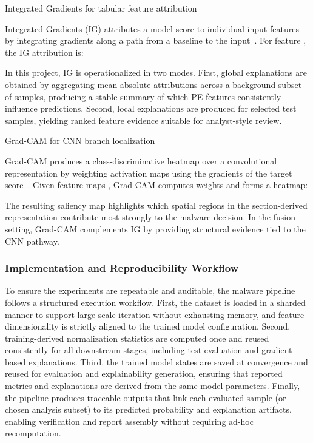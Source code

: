 \documentclass[conference]{IEEEtran}
\begin{document}
Integrated Gradients for tabular feature attribution

Integrated Gradients (IG) attributes a model score to individual input features by integrating gradients along a path from a baseline to the input~\cite{MAQ2017}. For feature , the IG attribution is:

In this project, IG is operationalized in two modes. First, global explanations are obtained by aggregating mean absolute attributions across a background subset of samples, producing a stable summary of which PE features consistently influence predictions. Second, local explanations are produced for selected test samples, yielding ranked feature evidence suitable for analyst-style review.

Grad-CAM for CNN branch localization

Grad-CAM produces a class-discriminative heatmap over a convolutional representation by weighting activation maps using the gradients of the target score~\cite{SCDVPB2017}. Given feature maps , Grad-CAM computes weights and forms a heatmap:

The resulting saliency map highlights which spatial regions in the section-derived representation contribute most strongly to the malware decision. In the fusion setting, Grad-CAM complements IG by providing structural evidence tied to the CNN pathway.

\subsubsection{Implementation and Reproducibility Workflow}

To ensure the experiments are repeatable and auditable, the malware pipeline follows a structured execution workflow. First, the dataset is loaded in a sharded manner to support large-scale iteration without exhausting memory, and feature dimensionality is strictly aligned to the trained model configuration. Second, training-derived normalization statistics are computed once and reused consistently for all downstream stages, including test evaluation and gradient-based explanations. Third, the trained model states are saved at convergence and reused for evaluation and explainability generation, ensuring that reported metrics and explanations are derived from the same model parameters. Finally, the pipeline produces traceable outputs that link each evaluated sample (or chosen analysis subset) to its predicted probability and explanation artifacts, enabling verification and report assembly without requiring ad-hoc recomputation.
\end{document}
